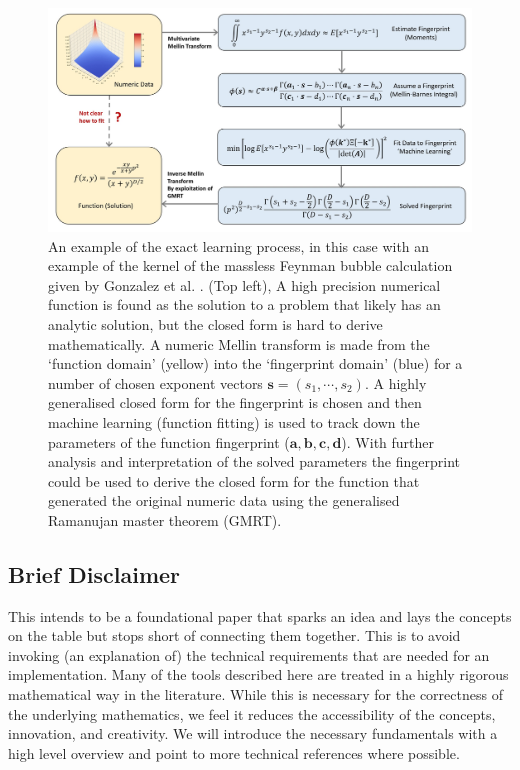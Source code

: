 \documentclass{article}
\begin{document}
\begin{figure}[h]
\includegraphics[scale = 0.323]{Figure1.jpg}
\caption{An example of the exact learning process, in this case with an example of the kernel of the massless Feynman bubble calculation given by Gonzalez et al. \cite{Gonzalez2015}. (Top left), A high precision numerical function is found as the solution to a problem that likely has an analytic solution, but the closed form is hard to derive mathematically. A numeric Mellin transform is made from the `function domain' (yellow) into the `fingerprint domain' (blue) for a number of chosen exponent vectors $\mathbf{s}=(s_1,\cdots,s_2)$. A highly generalised closed form for the fingerprint is chosen and then machine learning (function fitting) is used to track down the parameters of the function fingerprint ($\mathbf{a,b,c,d}$). With further analysis and interpretation of the solved parameters the fingerprint could be used to derive the closed form for the function that generated the original numeric data using the generalised Ramanujan master theorem (GMRT).}
\label{fig:Outline}
\end{figure}

\subsection{Brief Disclaimer}
This intends to be a foundational paper that sparks an idea and lays the concepts on the table but stops short of connecting them together. This is to avoid invoking (an explanation of) the technical requirements that are needed for an implementation. Many of the tools described here are treated in a highly rigorous mathematical way in the literature. While this is necessary for the correctness of the underlying mathematics, we feel it reduces the accessibility of the concepts, innovation, and creativity. We will introduce the necessary fundamentals with a high level overview and point to more technical references where possible. \\
\end{document}

